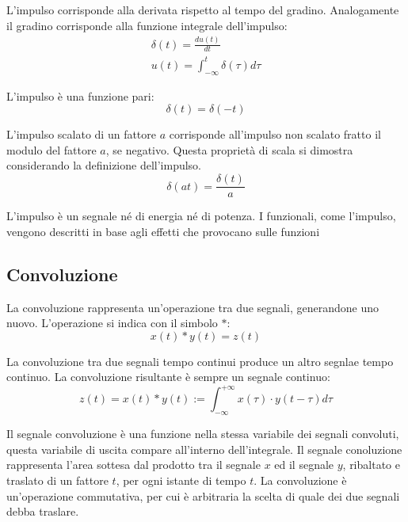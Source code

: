 \documentclass{article}
\numberwithin{equation}{subsection}
\begin{document}
L'impulso corrisponde alla derivata rispetto al tempo del gradino. Analogamente il gradino corrisponde alla funzione integrale dell'impulso:
\begin{gather*}
    \delta(t)=\displaystyle\frac{du(t)}{dt}\\
    u(t)=\displaystyle\int_{-\infty}^t\delta(\tau)d\tau
\end{gather*}



L'impulso è una funzione pari:
\begin{equation*}
    \delta(t)=\delta(-t)
\end{equation*}



L'impulso scalato di un fattore $a$ corrisponde all'impulso non scalato fratto il modulo del fattore $a$, se negativo. Questa proprietà di scala si dimostra considerando 
la definizione dell'impulso. 
\begin{equation*}
    \delta(at)=\displaystyle\frac{\delta(t)}{a}
\end{equation*}



L'impulso è un segnale né di energia né di potenza. I funzionali, come l'impulso, vengono descritti in base agli effetti che provocano sulle funzioni

\subsection{Convoluzione}

La convoluzione rappresenta un'operazione tra due segnali, generandone uno nuovo. L'operazione si indica con il simbolo $*$:
\begin{equation*}
    x(t)*y(t)=z(t)
\end{equation*}

La convoluzione tra due segnali tempo continui produce un altro segnlae tempo continuo. La convoluzione risultante è sempre un segnale continuo:
\begin{equation}
    z(t)=x(t)*y(t):=\displaystyle\int_{-\infty}^{+\infty}x(\tau)\cdot y(t-\tau)d\tau
\end{equation}

Il segnale convoluzione è una funzione nella stessa variabile dei segnali convoluti, questa variabile di uscita compare all'interno dell'integrale. Il segnale conoluzione 
rappresenta l'area sottesa dal prodotto tra il segnale $x$ ed il segnale $y$, ribaltato e traslato di un fattore $t$, per ogni istante di tempo $t$. La convoluzione 
è un'operazione commutativa, per cui è arbitraria la scelta di quale dei due segnali debba traslare. 
\end{document}
